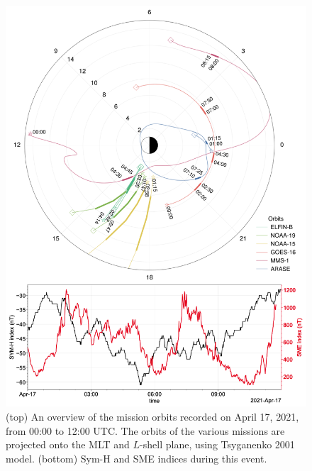 \documentclass[
  letterpaper,
  DIV=11,
  numbers=noendperiod]{scrartcl}
\begin{document}
\begin{figure}[H]

{\centering \includegraphics{figures/fig1_orbit_multi_mission_conjunctions.png}

}

\caption{(top) An overview of the mission orbits recorded on April 17, 2021, from 00:00 to 12:00 UTC. The orbits of the various missions are projected onto the MLT and \(L\)-shell plane, using Tsyganenko 2001 model. (bottom) Sym-H and SME indices during this event.}

\end{figure}%





\end{document}
